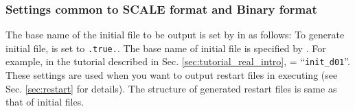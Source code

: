\subsubsection{Settings common to SCALE format and Binary format} \label{sec:datainput_common_setting}
The base name of the initial file to be output is set by  in  as follows:
To generate initial file,  is set to \verb|.true.|. 
The base name of initial file is specified by . 
For example, in the tutorial described in Sec. \ref{sec:tutorial_real_intro},  = ``\verb|init_d01|''.
These settings are used when you want to output restart files in executing \scalerm (see Sec. \ref{sec:restart} for details).
The structure of generated restart files is same as that of initial files.

